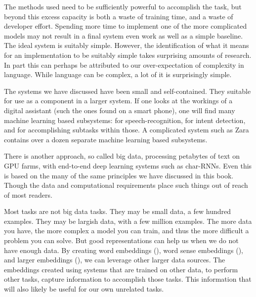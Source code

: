 \documentclass[12pt,parskip]{komatufte}
\begin{document}
The methods used need to be sufficiently powerful to accomplish the task,
but beyond this excess capacity is both a waste of training time,
and a waste of developer effort.
Spending more time to implement one of the more complicated models may not result in a final system even work as well as a simple baseline.
The ideal system is suitably simple.
However, the identification of what it means for an implementation to be suitably simple takes surprising amounts of research.
In part this can perhaps be attributed to our over-expectation of complexity in language.
While language can be complex, a lot of it is surprisingly simple.


The systems we have discussed have been small and self-contained.
They suitable for use as a component in a larger system.
If one looks at the workings of a digital assistant (such the ones found on a smart phone),
one will find many machine learning based subsystems:
for speech-recognition, for intent detection, and for accomplishing subtasks within those.
A complicated system such as Zara  contains over a dozen separate machine learning based subsystems.


There is another approach, so called big data, processing petabytes of text on GPU farms,
with end-to-end deep learning systems such as char-RNNs.
Even this is based on the many of the same principles we have discussed in this book.
Though the data and computational requirements place such things out of reach of most readers.


Most tasks are not big data tasks.
They may be small data, a few hundred examples.
They may be largish data, with a few million examples.
The more data you have, the more complex a model you can train,
and thus the more difficult a problem you can solve.
But good representations can help us when we do not have enough data.
By creating word embeddings (),
word sense embeddings (),
and larger embeddings (),
we can leverage other larger data sources.
The embeddings created using systems that are trained on other data, to perform other tasks,
capture information to accomplish those tasks.
This information that will also likely be useful for our own unrelated tasks.
\end{document}
